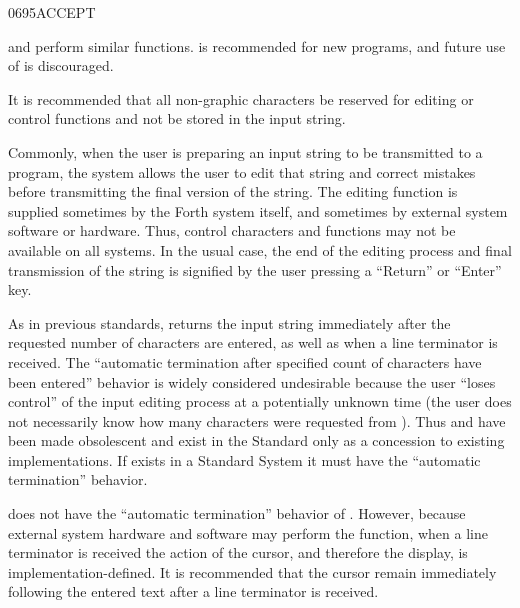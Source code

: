 \begin{newword}{0695}{ACCEPT}
\begin{rationale}
		 and  perform similar functions.
		 is recommended for new programs, and future use
		of  is discouraged.

		It is recommended that all non-graphic characters be reserved
		for editing or control functions and not be stored in the input
		string.

		Commonly, when the user is preparing an input string to be
		transmitted to a program, the system allows the user to edit
		that string and correct mistakes before transmitting the final
		version of the string. The editing function is supplied
		sometimes by the Forth system itself, and sometimes by external
		system software or hardware. Thus, control characters and
		functions may not be available on all systems. In the usual
		case, the end of the editing process and final transmission of
		the string is signified by the user pressing a ``Return'' or
		``Enter'' key.

		As in previous standards,  returns the input
		string immediately after the requested number of characters
		are entered, as well as when a line terminator is received.
		The ``automatic termination after specified count of characters
		have been entered'' behavior is widely considered undesirable
		because the user ``loses control'' of the input editing process
		at a potentially unknown time (the user does not necessarily
		know how many characters were requested from ).
		Thus  and  have been made obsolescent
		and exist in the Standard only as a concession to existing
		implementations. If  exists in a Standard System
		it must have the ``automatic termination'' behavior.

		 does not have the ``automatic termination''
		behavior of . However, because external system
		hardware and software may perform the  function,
		when a line terminator is received the action of the cursor,
		and therefore the display, is implementation-defined. It is
		recommended that the cursor remain immediately following the
		entered text after a line terminator is received.
	\end{rationale}
\end{newword}


